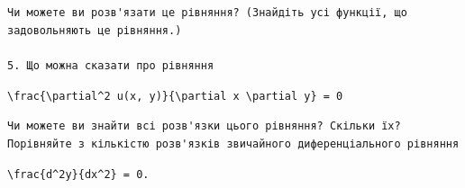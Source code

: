 \documentclass[
  ukrainian,
]{article}
\begin{document}
\begin{verbatim}
Чи можете ви розв'язати це рівняння? (Знайдіть усі функції, що задовольняють це рівняння.)

5. Що можна сказати про рівняння
\end{verbatim}

\texttt{\textbackslash{}frac\{\textbackslash{}partial\^{}2\ u(x,\ y)\}\{\textbackslash{}partial\ x\ \textbackslash{}partial\ y\}\ =\ 0}

\begin{verbatim}
Чи можете ви знайти всі розв'язки цього рівняння? Скільки їх? Порівняйте з кількістю розв'язків звичайного диференціального рівняння
\end{verbatim}

\texttt{\textbackslash{}frac\{d\^{}2y\}\{dx\^{}2\}\ =\ 0.}
\end{document}
